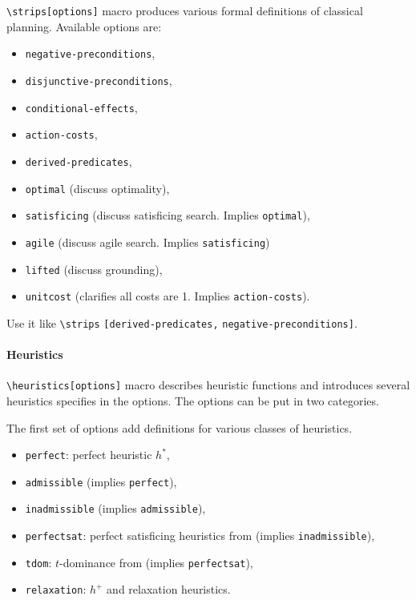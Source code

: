 \verb`\strips[options]` macro produces various formal definitions of classical planning.
Available options are:
\begin{itemize}
 \item \texttt{negative-preconditions},
 \item \texttt{disjunctive-preconditions},
 \item \texttt{conditional-effects},
 \item \texttt{action-costs},
 \item \texttt{derived-predicates},
 \item \texttt{optimal} (discuss optimality),
 \item \texttt{satisficing} (discuss satisficing search. Implies \texttt{optimal}),
 \item \texttt{agile} (discuss agile search. Implies \texttt{satisficing})
 \item \texttt{lifted} (discuss grounding),
 \item \texttt{unitcost} (clarifies all costs are 1. Implies \texttt{action-costs}).
\end{itemize}
Use it like \verb`\strips` \texttt{[derived-predicates,} \texttt{negative-preconditions]}.

\paragraph{Heuristics}

\verb`\heuristics[options]` macro describes heuristic functions and
introduces several heuristics specifies in the options.
The options can be put in two categories.

The first set of options add definitions for various classes of heuristics.
\begin{itemize}
 \item \texttt{perfect}: perfect heuristic $h^*$,
 \item \texttt{admissible} (implies \texttt{perfect}),
 \item \texttt{inadmissible} (implies \texttt{admissible}),
 \item \texttt{perfectsat}: perfect satisficing heuristics from \cite{kuroiwa2022biased} (implies \texttt{inadmissible}),
 \item \texttt{tdom}: $t$-dominance from \cite{kuroiwa2022biased} (implies \texttt{perfectsat}),
 \item \texttt{relaxation}: $h^+$ and relaxation heuristics.
\end{itemize}


